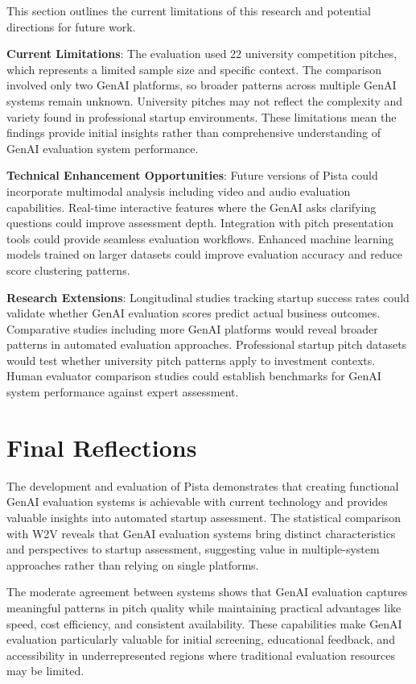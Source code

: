 This section outlines the current limitations of this research and potential directions for future work.

\textbf{Current Limitations}: The evaluation used 22 university competition pitches, which represents a limited sample size and specific context. The comparison involved only two GenAI platforms, so broader patterns across multiple GenAI systems remain unknown. University pitches may not reflect the complexity and variety found in professional startup environments. These limitations mean the findings provide initial insights rather than comprehensive understanding of GenAI evaluation system performance.

\textbf{Technical Enhancement Opportunities}: Future versions of Pista could incorporate multimodal analysis including video and audio evaluation capabilities. Real-time interactive features where the GenAI asks clarifying questions could improve assessment depth. Integration with pitch presentation tools could provide seamless evaluation workflows. Enhanced machine learning models trained on larger datasets could improve evaluation accuracy and reduce score clustering patterns.

\textbf{Research Extensions}: Longitudinal studies tracking startup success rates could validate whether GenAI evaluation scores predict actual business outcomes. Comparative studies including more GenAI platforms would reveal broader patterns in automated evaluation approaches. Professional startup pitch datasets would test whether university pitch patterns apply to investment contexts. Human evaluator comparison studies could establish benchmarks for GenAI system performance against expert assessment.

\section{Final Reflections}
\label{sec:final-thoughts}

The development and evaluation of Pista demonstrates that creating functional GenAI evaluation systems is achievable with current technology and provides valuable insights into automated startup assessment. The statistical comparison with W2V reveals that GenAI evaluation systems bring distinct characteristics and perspectives to startup assessment, suggesting value in multiple-system approaches rather than relying on single platforms.

The moderate agreement between systems shows that GenAI evaluation captures meaningful patterns in pitch quality while maintaining practical advantages like speed, cost efficiency, and consistent availability. These capabilities make GenAI evaluation particularly valuable for initial screening, educational feedback, and accessibility in underrepresented regions where traditional evaluation resources may be limited.

